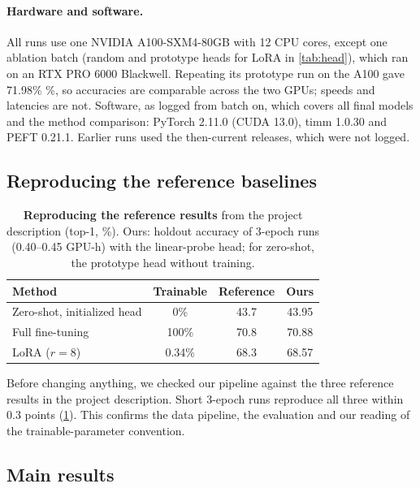 \paragraph{Hardware and software.}
All runs use one NVIDIA A100-SXM4-80GB with 12 CPU cores, except one ablation batch (random and prototype heads for LoRA in \cref{tab:head}), which ran on an RTX PRO 6000 Blackwell.
Repeating its prototype run on the A100 gave 71.98\% \%, so accuracies are comparable across the two GPUs; speeds and latencies are not.
Software, as logged from batch  on, which covers all final models and the method comparison: PyTorch 2.11.0 (CUDA 13.0), timm 1.0.30 and PEFT 0.21.1. Earlier runs used the then-current releases, which were not logged.

\subsection{Reproducing the reference baselines}

\begin{table}[t]
  \centering
  \footnotesize
  \setlength{\tabcolsep}{4pt}
  \begin{tabular}{@{}lccc@{}}
    \toprule
    Method & Trainable & Reference & Ours \\
    \midrule
    Zero-shot, initialized head & 0\% & 43.7 & 43.95 \\
    Full fine-tuning & 100\% & 70.8 & 70.88 \\
    LoRA ($r=8$) & 0.34\% & 68.3 & 68.57 \\
    \bottomrule
  \end{tabular}
  \caption{\textbf{Reproducing the reference results} from the project description (top-1, \%).
  Ours: holdout accuracy of 3-epoch runs (0.40--0.45 GPU-h) with the linear-probe head; for zero-shot, the prototype head without training.}
  \label{tab:baselines}
\end{table}

Before changing anything, we checked our pipeline against the three reference results in the project description.
Short 3-epoch runs reproduce all three within 0.3 points (\cref{tab:baselines}).
This confirms the data pipeline, the evaluation and our reading of the trainable-parameter convention.

\subsection{Main results}
\label{sec:main}


